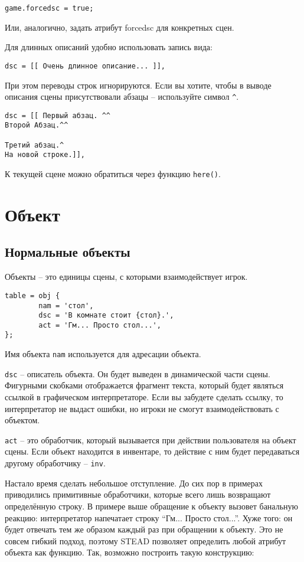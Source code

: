 \documentclass[a4paper,12pt]{article}
\begin{document}
\begin{verbatim}
game.forcedsc = true;
\end{verbatim}

Или, аналогично, задать атрибут forcedsc для конкретных сцен.

Для длинных описаний удобно использовать запись вида:

\begin{verbatim}
dsc = [[ Очень длинное описание... ]],
\end{verbatim}

При этом переводы строк игнорируются. Если вы хотите, чтобы в выводе описания сцены присутствовали абзацы -- используйте символ \verb/^/.

\begin{verbatim}
dsc = [[ Первый абзац. ^^
Второй Абзац.^^

Третий абзац.^
На новой строке.]],
\end{verbatim}

К текущей сцене можно обратиться через функцию \verb/here()/.

\section{Объект}
\subsection{Нормальные объекты}
Объекты -- это единицы сцены, с которыми взаимодействует игрок.

\begin{verbatim}
table = obj {
        nam = 'стол',
        dsc = 'В комнате стоит {стол}.',
        act = 'Гм... Просто стол...',
};
\end{verbatim}

Имя объекта \verb/nam/ используется для адресации объекта.

\verb/dsc/ -- описатель объекта. Он будет выведен в динамической части сцены. Фигурными скобками отображается фрагмент текста, который будет являться ссылкой в графическом интерпретаторе. Если вы забудете сделать ссылку, то интерпретатор не выдаст ошибки, но игроки не смогут взаимодействовать с объектом.

\verb/act/ -- это обработчик, который вызывается при действии пользователя на объект сцены. Если объект находится в инвентаре, то действие с ним будет передаваться другому обработчику -- \verb/inv/.

Настало время сделать небольшое отступление. До сих пор в примерах приводились примитивные обработчики, которые всего лишь возвращают определённую строку. В примере выше обращение к объекту вызовет банальную реакцию: интерпретатор напечатает строку ``Гм... Просто стол...''. Хуже того: он будет отвечать тем же образом каждый раз при обращении к объекту. Это не совсем гибкий подход, поэтому STEAD позволяет определить любой атрибут объекта как функцию. Так, возможно построить такую конструкцию:
\end{document}
